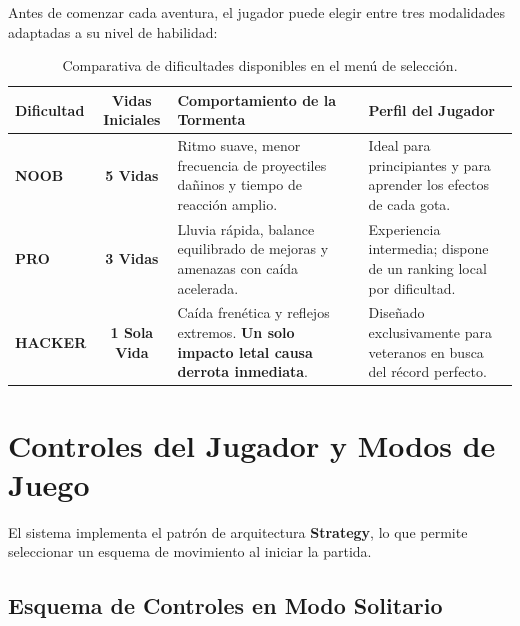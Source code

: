 \documentclass[11pt,a4paper]{article}
\begin{document}
Antes de comenzar cada aventura, el jugador puede elegir entre tres modalidades adaptadas a su nivel de habilidad:

\begin{table}[h!]
\centering
\begin{tcolorbox}[enhanced, colback=white, colframe=NavyDark, arc=3mm, boxrule=1pt, width=\textwidth, left=4pt, right=4pt, top=4pt, bottom=4pt]
\begin{tabularx}{\textwidth}{lcXX}
\toprule
\textbf{Dificultad} & \textbf{Vidas Iniciales} & \textbf{Comportamiento de la Tormenta} & \textbf{Perfil del Jugador} \\
\midrule
\textbf{NOOB} & \textbf{5 Vidas} & Ritmo suave, menor frecuencia de proyectiles dañinos y tiempo de reacción amplio. & Ideal para principiantes y para aprender los efectos de cada gota. \\
\textbf{PRO} & \textbf{3 Vidas} & Lluvia rápida, balance equilibrado de mejoras y amenazas con caída acelerada. & Experiencia intermedia; dispone de un ranking local por dificultad. \\
\textbf{HACKER} & \textbf{1 Sola Vida} & Caída frenética y reflejos extremos. \textbf{Un solo impacto letal causa derrota inmediata}. & Diseñado exclusivamente para veteranos en busca del récord perfecto. \\
\bottomrule
\end{tabularx}
\end{tcolorbox}
\caption{Comparativa de dificultades disponibles en el menú de selección.}
\end{table}

\newpage

\section{Controles del Jugador y Modos de Juego}
\label{sec:controles}

El sistema implementa el patrón de arquitectura \textbf{Strategy}, lo que permite seleccionar un esquema de movimiento al iniciar la partida.

\subsection*{Esquema de Controles en Modo Solitario}
\end{document}

